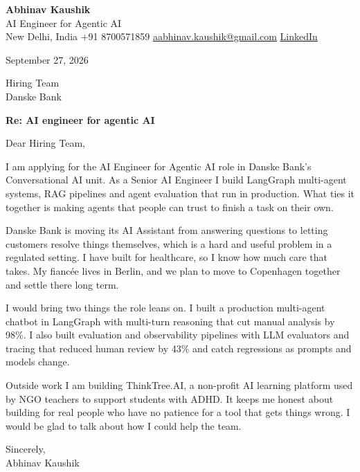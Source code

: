 \documentclass[11pt,a4paper]{article}
\begin{document}
{\Large\bfseries Abhinav Kaushik}\\
AI Engineer for Agentic AI\\
New Delhi, India \textbar{} +91 8700571859 \textbar{} \href{mailto:aabhinav.kaushik@gmail.com}{aabhinav.kaushik@gmail.com} \textbar{} \href{https://www.linkedin.com/in/abhinav-kaushik10/}{LinkedIn}  

September 27, 2026

Hiring Team\\
Danske Bank

\textbf{Re: AI engineer for agentic AI}

Dear Hiring Team,

I am applying for the AI Engineer for Agentic AI role in Danske Bank's Conversational AI unit. As a Senior AI Engineer I build LangGraph multi-agent systems, RAG pipelines and agent evaluation that run in production. What ties it together is making agents that people can trust to finish a task on their own.

Danske Bank is moving its AI Assistant from answering questions to letting customers resolve things themselves, which is a hard and useful problem in a regulated setting. I have built for healthcare, so I know how much care that takes. My fiancée lives in Berlin, and we plan to move to Copenhagen together and settle there long term.

I would bring two things the role leans on. I built a production multi-agent chatbot in LangGraph with multi-turn reasoning that cut manual analysis by 98\%. I also built evaluation and observability pipelines with LLM evaluators and tracing that reduced human review by 43\% and catch regressions as prompts and models change.

Outside work I am building ThinkTree.AI, a non-profit AI learning platform used by NGO teachers to support students with ADHD. It keeps me honest about building for real people who have no patience for a tool that gets things wrong. I would be glad to talk about how I could help the team.

Sincerely,\\[4pt]
Abhinav Kaushik
\end{document}
